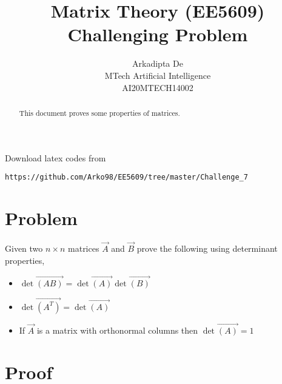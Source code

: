 \documentclass[journal,12pt,twocolumn]{IEEEtran}
\begin{document}
     \def\rightbox#1{\makebox[0in][r]{#1}}
     \def\centbox#1{\makebox[0in]{#1}}
     \def\topbox#1{\raisebox{-\baselineskip}[0in][0in]{#1}}
     \def\midbox#1{\raisebox{-0.5\baselineskip}[0in][0in]{#1}}
\vspace{3cm}
\title{Matrix Theory (EE5609) Challenging Problem}
\author{Arkadipta De\\MTech Artificial Intelligence\\AI20MTECH14002}
\maketitle
\newpage
\bigskip
\renewcommand{\thefigure}{\theenumi}
\renewcommand{\thetable}{\theenumi}
\begin{abstract}
This document proves some properties of matrices.
\end{abstract}
Download latex codes from 
%
\begin{lstlisting}
https://github.com/Arko98/EE5609/tree/master/Challenge_7
\end{lstlisting}
%
\section{Problem}
Given two $n \times n$ matrices $\vec{A}$ and $\vec{B}$ prove the following using determinant properties, 
\begin{itemize}
    \item $\det\vec{(AB)} = \det\vec{(A)}\det\vec{(B)}$
    \item $\det\vec{(A^T)} = \det\vec{(A)}$
    \item If $\vec{A}$ is a matrix with orthonormal columns then $\det\vec{(A)} = 1$
\end{itemize}
\section{Proof}
\end{document}
